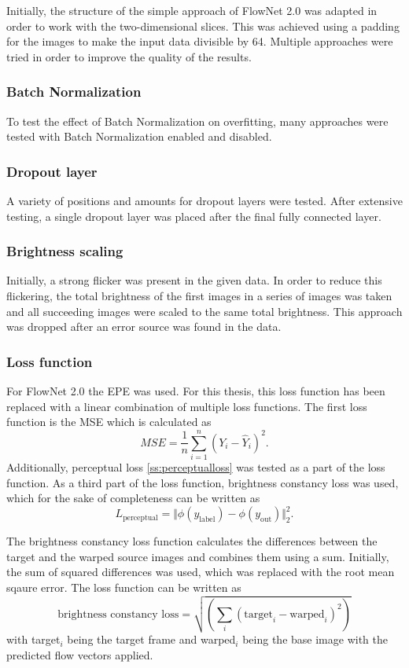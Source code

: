 Initially, the structure of the simple approach of FlowNet 2.0 \cite{ilgFlowNetEvolutionOptical2016} was adapted in order to work with the two-dimensional slices. This was achieved using a padding for the images to make the input data divisible by 64.
Multiple approaches were tried in order to improve the quality of the results.
\subsubsection{Batch Normalization}
To test the effect of Batch Normalization on overfitting, many approaches were tested with Batch Normalization enabled and disabled.
\subsubsection{Dropout layer}
A variety of positions and amounts for dropout layers were tested. After extensive testing, a single dropout layer was placed after the final fully connected layer.
\subsubsection{Brightness scaling}
Initially, a strong flicker was present in the given data. In order to reduce this flickering, the total brightness of the first images in a series of images was taken and all succeeding images were scaled to the same total brightness. This approach was dropped after an error source was found in the data.
\subsubsection{Loss function}
\label{sss:lossfunctions}
For FlowNet 2.0 the \acs{EPE} was used. For this thesis, this loss function has been replaced with a linear combination of multiple loss functions.
The first loss function is the \ac{MSE} which is calculated as
$$MSE=\dfrac{1}{n}\sum_{i=1}^{n}\left(Y_i -\hat{Y}_i\right)^2.$$
Additionally, perceptual loss \eqref{ss:perceptualloss} was tested as a part of the loss function.
As a third part of the loss function, brightness constancy loss was used, which for the sake of completeness can be written as \begin{equation}
L_\text{perceptual} = \Vert \phi(y_\text{label}) - \phi (y_\text{out})\Vert^2_2.
\end{equation}


 The  brightness constancy loss function calculates the differences between the target and the warped source images and combines them using a sum. Initially, the sum of squared differences was used, which was replaced with the root mean sqaure error.
The loss function can be written as
\begin{equation}
	\text{brightness constancy loss} = \sqrt{(\sum_{i} ( \text{target}_i - \text{warped}_i )^2)}
\end{equation}
with target$_i$ being the target frame and warped$_i$ being the base image with the predicted flow vectors applied.

